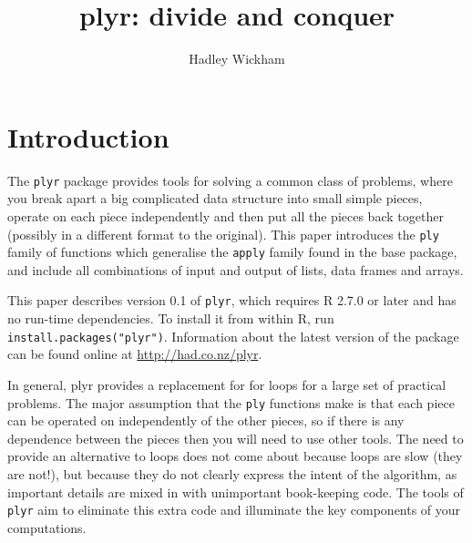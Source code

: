 \documentclass[letterpage]{scrartcl}
\title{plyr: divide and conquer}
\author{Hadley Wickham}
\begin{document}
\maketitle


\section{Introduction}

The {\tt plyr} package provides tools for solving a common class of problems, where you break apart a big complicated data structure into small simple pieces, operate on each piece independently and then put all the pieces back together (possibly in a different format to the original).  This paper introduces the {\tt ply} family of functions which generalise the {\tt apply} family found in the base package, and include all combinations of input and output of lists, data frames and arrays.

This paper describes version 0.1 of {\tt plyr}, which requires R 2.7.0 or later and has no run-time dependencies.  To install it from within R, run {\tt install.packages("plyr")}.  Information about the latest version of the package can be found online at \url{http://had.co.nz/plyr}.  


In general, plyr provides a replacement for for loops for a large set of practical problems.  The major assumption that the {\tt ply} functions make is that each piece can be operated on independently of the other pieces, so if there is any dependence between the pieces then you will need to use other tools.  The need to provide an alternative to loops does not come about because loops are slow (they are not!), but because they do not clearly express the intent of the algorithm, as important details are mixed in with unimportant book-keeping code. The tools of {\tt plyr} aim to eliminate this extra code and illuminate the key components of your computations.
\end{document}
